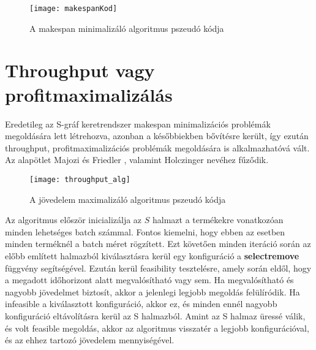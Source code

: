\begin{figure}[H]
\begin{center}
\texttt{[image: makespanKod]}
\caption{A makespan minimalizáló algoritmus pszeudó kódja\cite{Hegyhati}}
\label{makespanKod}
\end{center}
\end{figure}

\section{Throughput vagy profitmaximalizálás}
Eredetileg az S-gráf keretrendszer makespan minimalizációs problémák megoldására lett létrehozva, azonban a későbbiekben bővítésre került, így ezután throughput, profitmaximalizációs problémák megoldására is alkalmazhatóvá vált. Az alapötlet Majozi és Friedler \cite{majozifriedler}, valamint Holczinger \cite{holczinger} nevéhez fűződik.
\begin{figure}[H]
\begin{center}
\texttt{[image: throughput\_alg]}
\caption{A jövedelem maximalizáló algoritmus pszeudó kódja \cite{Hegyhati}}
\label{throughput_alg}
\end{center}
\end{figure}
Az algoritmus először inicializálja az $S$ halmazt a termékekre vonatkozóan minden lehetséges batch számmal. Fontos kiemelni, hogy ebben az esetben minden terméknél a batch méret rögzített. Ezt követően minden iteráció során az előbb említett halmazból kiválasztásra kerül egy konfiguráció a \textbf{select\textunderscore remove} függvény segítségével. Ezután kerül feasibility tesztelésre, amely során eldől, hogy a megadott időhorizont alatt megvalósítható vagy sem. Ha megvalósítható és nagyobb jövedelmet biztosít, akkor a jelenlegi legjobb megoldás felülíródik. Ha infeasible a kiválasztott konfiguráció, akkor ez, és minden ennél nagyobb konfiguráció eltávolításra kerül az S halmazból. Amint az S halmaz üressé válik, és volt feasible megoldás, akkor az algoritmus visszatér a legjobb konfigurációval, és az ehhez tartozó jövedelem mennyiségével.

